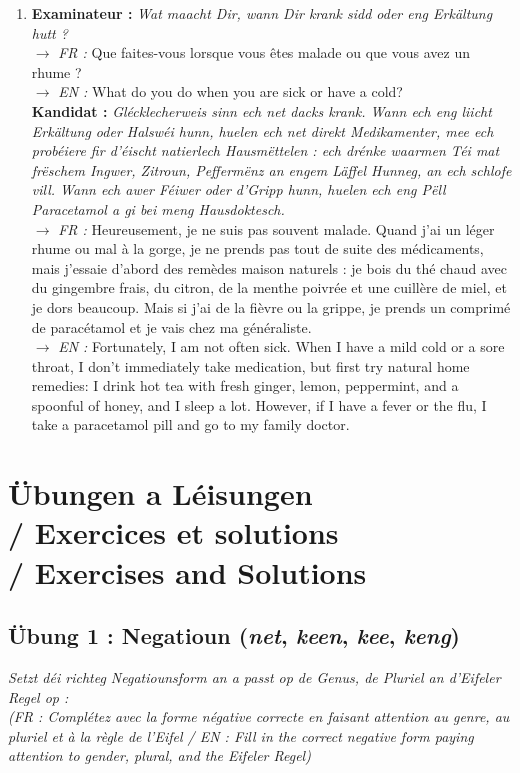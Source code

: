 \begin{enumerate}
    \item \textbf{Examinateur :} \textit{Wat maacht Dir, wann Dir krank sidd oder eng Erkältung hutt ?} \\
    $\rightarrow$ \textit{FR :} Que faites-vous lorsque vous êtes malade ou que vous avez un rhume ? \\
    $\rightarrow$ \textit{EN :} What do you do when you are sick or have a cold? \\
    \textbf{Kandidat :} \textit{Glécklecherweis sinn ech net dacks krank. Wann ech eng liicht Erkältung oder Halswéi hunn, huelen ech net direkt Medikamenter, mee ech probéiere fir d'éischt natierlech Hausmëttelen : ech drénke waarmen Téi mat frëschem Ingwer, Zitroun, Peffermënz an engem Läffel Hunneg, an ech schlofe vill. Wann ech awer Féiwer oder d'Gripp hunn, huelen ech eng Pëll Paracetamol a gi bei meng Hausdoktesch.} \\
    $\rightarrow$ \textit{FR :} Heureusement, je ne suis pas souvent malade. Quand j'ai un léger rhume ou mal à la gorge, je ne prends pas tout de suite des médicaments, mais j'essaie d'abord des remèdes maison naturels : je bois du thé chaud avec du gingembre frais, du citron, de la menthe poivrée et une cuillère de miel, et je dors beaucoup. Mais si j'ai de la fièvre ou la grippe, je prends un comprimé de paracétamol et je vais chez ma généraliste. \\
    $\rightarrow$ \textit{EN :} Fortunately, I am not often sick. When I have a mild cold or a sore throat, I don't immediately take medication, but first try natural home remedies: I drink hot tea with fresh ginger, lemon, peppermint, and a spoonful of honey, and I sleep a lot. However, if I have a fever or the flu, I take a paracetamol pill and go to my family doctor.
\end{enumerate}

\vspace{1.5em}

\section[Übungen a Léisungen / Exercises and Solutions]{Übungen a Léisungen \\/ Exercices et solutions \\/ Exercises and Solutions}

\subsection*{Übung 1 : Negatioun (\textit{net}, \textit{keen}, \textit{kee}, \textit{keng})}
\textit{Setzt déi richteg Negatiounsform an a passt op de Genus, de Pluriel an d'Eifeler Regel op :} \\
\textit{\small(FR : Complétez avec la forme négative correcte en faisant attention au genre, au pluriel et à la règle de l'Eifel / EN : Fill in the correct negative form paying attention to gender, plural, and the Eifeler Regel)}

